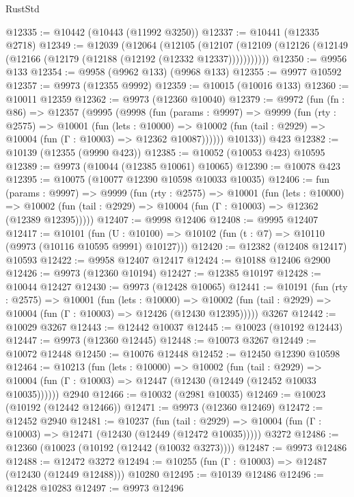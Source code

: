 \begin{lexlean}{RustStd}
\begin{coremodule}
@12335 := @10442 (@10443 (@11992 @3250))
@12337 := @10441 (@12335 @2718)
@12349 := @12039
    (@12064
      (@12105
        (@12107 (@12109 (@12126 (@12149 (@12166 (@12179 (@12188 (@12192 (@12332 @12337)))))))))))
@12350 := @9956 @133
@12354 := @9958 (@9962 @133) (@9968 @133)
@12355 := @9977 @10592
@12357 := @9973 (@12355 @9992)
@12359 := @10015 (@10016 @133)
@12360 := @10011 @12359
@12362 := @9973 (@12360 @10040)
@12379 := @9972
    (fun (fn : @86) =>
    @12357
      (@9995
        (@9998
          (fun (params : @9997) =>
          @9999
            (fun (rty : @2575) =>
            @10001
              (fun (lets : @10000) =>
              @10002 (fun (tail : @2929) => @10004 (fun (Γ : @10003) => @12362 @10087))))))
        @10133))
    @423
@12382 := @10139 (@12355 (@9990 @423))
@12385 := @10052 (@10053 @423) @10595
@12389 := @9973 (@10044 (@12385 @10061) @10065)
@12390 := @10078 @423
@12395 := @10075 (@10077 @12390 @10598 @10033 @10035)
@12406 := fun (params : @9997) =>
  @9999
    (fun (rty : @2575) =>
    @10001
      (fun (lets : @10000) =>
      @10002 (fun (tail : @2929) => @10004 (fun (Γ : @10003) => @12362 (@12389 @12395)))))
@12407 := @9998 @12406
@12408 := @9995 @12407
@12417 := @10101
    (fun (U : @10100) => @10102 (fun (t : @7) => @10110 (@9973 (@10116 @10595 @9991) @10127)))
@12420 := @12382 (@12408 @12417) @10593
@12422 := @9958 @12407 @12417
@12424 := @10188 @12406 @2900
@12426 := @9973 (@12360 @10194)
@12427 := @12385 @10197
@12428 := @10044 @12427
@12430 := @9973 (@12428 @10065)
@12441 := @10191
    (fun (rty : @2575) =>
    @10001
      (fun (lets : @10000) =>
      @10002 (fun (tail : @2929) => @10004 (fun (Γ : @10003) => @12426 (@12430 @12395)))))
    @3267
@12442 := @10029 @3267
@12443 := @12442 @10037
@12445 := @10023 (@10192 @12443)
@12447 := @9973 (@12360 @12445)
@12448 := @10073 @3267
@12449 := @10072 @12448
@12450 := @10076 @12448
@12452 := @12450 @12390 @10598
@12464 := @10213
    (fun (lets : @10000) =>
    @10002
      (fun (tail : @2929) =>
      @10004 (fun (Γ : @10003) => @12447 (@12430 (@12449 (@12452 @10033 @10035))))))
    @2940
@12466 := @10032 (@2981 @10035)
@12469 := @10023 (@10192 (@12442 @12466))
@12471 := @9973 (@12360 @12469)
@12472 := @12452 @2940
@12481 := @10237
    (fun (tail : @2929) => @10004 (fun (Γ : @10003) => @12471 (@12430 (@12449 (@12472 @10035)))))
    @3272
@12486 := @12360 (@10023 (@10192 (@12442 (@10032 @3273))))
@12487 := @9973 @12486
@12488 := @12472 @3272
@12494 := @10255 (fun (Γ : @10003) => @12487 (@12430 (@12449 @12488))) @10280
@12495 := @10139 @12486
@12496 := @12428 @10283
@12497 := @9973 @12496

\end{coremodule}
\end{lexlean}
